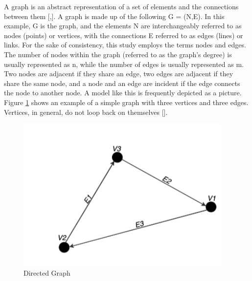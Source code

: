 A graph is an abstract representation of a set of elements and the connections between them [\cite{IntroductiontoGraphTheoryTrudeau:1994},\cite{Boeing:2017}]. A graph is made up of the following G = (N,E). In this example, G is the graph, and the elements N are interchangeably referred to as nodes (points) or vertices, with the connections E referred to as edges (lines) or links. For the sake of consistency, this study employs the terms nodes and edges. The number of nodes within the graph (referred to as the graph's degree) is usually represented as n, while the number of edges is usually represented as m. Two nodes are adjacent if they share an edge, two edges are adjacent if they share the same node, and a node and an edge are incident if the edge connects the node to another node. A model like this is frequently depicted as a picture. Figure \ref{fig:directedgraph} shows an example of a simple graph with three vertices and three edges. Vertices, in general, do not loop back on themselves [\cite{Duo:2002}].

\begin{figure}[h]
\centering
\includegraphics[width=0.95\textwidth,center]{picture/figure5.png}
\caption[Directed Graph]{Directed Graph}
\label{fig:directedgraph}
\end{figure}

